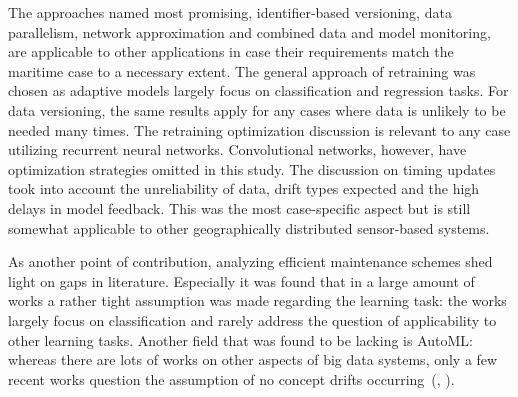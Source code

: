 The approaches named most promising, identifier-based versioning, data parallelism, network approximation and combined data and model monitoring, are applicable to other applications in case their requirements match the maritime case to a necessary extent. The general approach of retraining was chosen as adaptive models largely focus on classification and regression tasks. For data versioning, the same results apply for any cases where data is unlikely to be needed many times. The retraining optimization discussion is relevant to any case utilizing recurrent neural networks. Convolutional networks, however, have optimization strategies omitted in this study. The discussion on timing updates took into account the unreliability of data, drift types expected and the high delays in model feedback. This was the most case-specific aspect but is still somewhat applicable to other geographically distributed sensor-based systems.


 
 
 As another point of contribution, analyzing efficient maintenance schemes shed light on gaps in literature. Especially it was found that in a large amount of works a rather tight assumption was made regarding the learning task: the works largely focus on classification and rarely address the question of applicability to other learning tasks. Another field that was found to be lacking is AutoML: whereas there are lots of works on other aspects of big data systems, only a few recent works question the assumption of no concept drifts occurring~(\cite{celikAdaptationStrategiesAutomated2021}, \cite{madridAutoMLPresenceDrift2019}).
 
 
